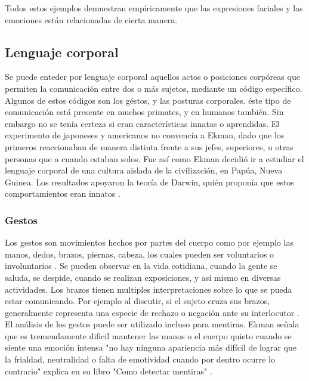 Todos estos ejemplos demuestran emp\'iricamente que las expresiones faciales y las emociones est\'an relacionadas de cierta manera.


\subsection{Lenguaje corporal}
Se puede enteder por lenguaje corporal aquellos actos o posiciones corp\'oreas que permiten la comunicaci\'on entre dos o m\'as sujetos, mediante un c\'odigo espec\'ifico. Algunos de estos c\'odigos son los g\'estos, y las posturas corporales.
\'este tipo de comunicaci\'on est\'a presente en muchos primates, y en humanos tambi\'en. Sin embargo no se ten\'ia certeza si eran caracter\'isticas innatas o aprendidas. El experimento de japoneses y americanos no convenc\'ia a Ekman, dado que los primeros reaccionaban de manera distinta frente a sus jefes, superiores, u otras personas que a cuando estaban solos. Fue as\'i como Ekman decidi\'o ir a estudiar el lenguaje corporal de una cultura aislada de la civilizaci\'on, en Pap\'ua, Nueva Guinea. Los resultados apoyaron la teor\'ia de Darwin, qui\'en propon\'ia que estos comportamientos eran innatos \cite{EkmanArticulo}.

\subsubsection{Gestos}
Los gestos son movimientos hechos por partes del cuerpo como por ejemplo las manos, dedos, brazos, piernas, cabeza, los cuales pueden ser voluntarios o involuntarios \cite{KurienBodyLanguage}. Se pueden observar en la vida cotidiana, cuando la gente se saluda, se despide, cuando se realizan exposiciones, y as\'i mismo en diversas actividades.
Los brazos tienen multiples interpretaciones sobre lo que se pueda estar comunicando. Por ejemplo al discutir, si el sujeto cruza sus brazos, generalmente representa una especie de rechazo o negaci\'on ante su interlocutor \cite{KurienBodyLanguage}.
El an\'alisis de los gestos puede ser utilizado incluso para  mentiras. Ekman se\~nala que es tremendamente dificil mantener las manos o el cuerpo quieto cuando se siente una emoci\'on intensa "no hay ninguna apariencia m\'as dif\'icil de lograr que la frialdad, neutralidad o falta de emotividad cuando por dentro ocurre lo contrario" explica en su libro "Como detectar mentiras" \cite{EkmanComoDetectarMentiras}.

